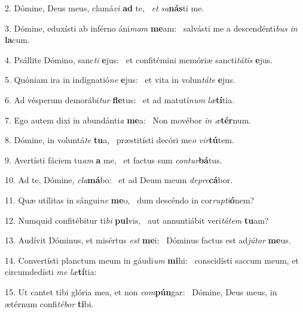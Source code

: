 2. Dómine, Deus meus, clamá\textit{vi} \textbf{ad} te, \ast\  \textit{et} \textit{sa}\textbf{nás}ti me.\

3. Dómine, eduxísti ab inférno áni\textit{mam} \textbf{me}am: \ast\  salvásti me a descendénti\textit{bus} \textit{in} \textbf{la}cum.\

4. Psállite Dómino, sanc\textit{ti} \textbf{e}jus: \ast\  et confitémini memóriæ sancti\textit{tá}\textit{tis} \textbf{e}jus.\

5. Quóniam ira in indignatió\textit{ne} \textbf{e}jus: \ast\  et vita in volun\textit{tá}\textit{te} \textbf{e}jus.\

6. Ad vésperum demorábi\textit{tur} \textbf{fle}tus: \ast\  et ad matutí\textit{num} \textit{læ}\textbf{tí}tia.\

7. Ego autem dixi in abundánti\textit{a} \textbf{me}a: \ast\  Non movébor \textit{in} \textit{æ}\textbf{tér}num.\

8. Dómine, in voluntá\textit{te} \textbf{tu}a, \ast\  præstitísti decóri me\textit{o} \textit{vir}\textbf{tú}tem.\

9. Avertísti fáciem tu\textit{am} \textbf{a} me, \ast\  et factus sum \textit{con}\textit{tur}\textbf{bá}tus.\

10. Ad te, Dómine, \textit{cla}\textbf{má}bo: \ast\  et ad Deum meum \textit{de}\textit{pre}\textbf{cá}bor.\

11. Quæ utílitas in sángui\textit{ne} \textbf{me}o, \ast\  dum descéndo in cor\textit{rup}\textit{ti}\textbf{ó}nem?\

12. Numquid confitébitur ti\textit{bi} \textbf{pul}vis, \ast\  aut annuntiábit veri\textit{tá}\textit{tem} \textbf{tu}am?\

13. Audívit Dóminus, et misértus \textit{est} \textbf{me}i: \ast\  Dóminus factus est ad\textit{jú}\textit{tor} \textbf{me}us.\

14. Convertísti planctum meum in gáudi\textit{um} \textbf{mi}hi: \ast\  conscidísti saccum meum, et circumdedísti \textit{me} \textit{læ}\textbf{tí}tia:\

15. Ut cantet tibi glória mea, et non \textit{com}\textbf{pún}gar: \ast\  Dómine, Deus meus, in ætérnum confi\textit{té}\textit{bor} \textbf{ti}bi.\

